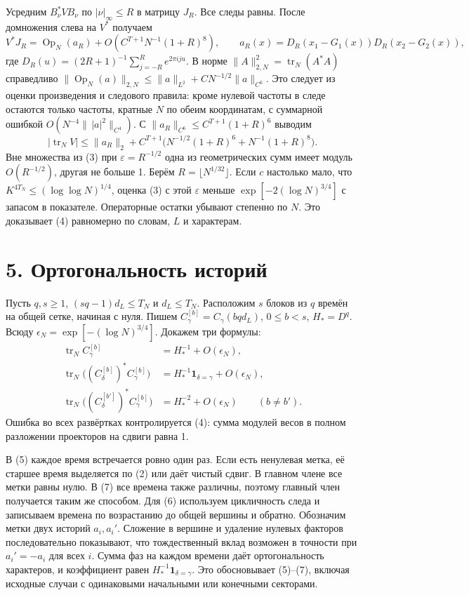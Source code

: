 \documentclass[11pt,a4paper]{article}
\newcommand{\trn}{\operatorname{tr}_N}
\newcommand{\Op}{\operatorname{Op}}
\newcommand{\sect}[1]{\section*{\sffamily\color{ink}#1}}
\begin{document}
Усредним \(B_\nu^* V B_\nu\) по \(|\nu|_\infty\le R\) в матрицу \(J_R\). Все следы равны. После домножения слева на \(V^*\) получаем
\[
 V^*J_R=\Op_N(a_R)+O(C^{T+1}N^{-1}(1+R)^8),\qquad
 a_R(x)=D_R(x_1-G_1(x))D_R(x_2-G_2(x)),
\]
где \(D_R(u)=(2R+1)^{-1}\sum_{j=-R}^R e^{2\pi iju}\).
В норме \(\|A\|_{2,N}^2=\trn(A^*A)\) справедливо
\(\|\Op_N(a)\|_{2,N}\le\|a\|_{L^2}+CN^{-1/2}\|a\|_{C^6}\).
Это следует из оценки произведения и следового правила: кроме нулевой частоты в следе остаются только частоты, кратные \(N\) по обеим координатам, с суммарной ошибкой \(O(N^{-4}\|\,|a|^2\|_{C^4})\). С \(\|a_R\|_{C^6}\le C^{T+1}(1+R)^6\) выводим
\[
   |\trn V|\le \|a_R\|_2+
       C^{T+1}\bigl(N^{-1/2}(1+R)^6+N^{-1}(1+R)^8\bigr).
\]
Вне множества из (3) при \(\varepsilon=R^{-1/2}\) одна из геометрических сумм имеет модуль \(O(R^{-1/2})\), другая не больше 1. Берём \(R=\lfloor N^{1/32}\rfloor\). Если \(c\) настолько мало, что \(K^{4T_N}\le(\log\log N)^{1/4}\), оценка (3) с этой \(\varepsilon\) меньше \(\exp[-2(\log N)^{3/4}]\) с запасом в показателе. Операторные остатки убывают степенно по \(N\). Это доказывает (4) равномерно по словам, \(L\) и характерам.

\newpage
\sect{5. Ортогональность историй}
Пусть \(q,s\ge1\), \((sq-1)d_L\le T_N\) и \(d_L\le T_N\).
Расположим \(s\) блоков из \(q\) времён на общей сетке, начиная с нуля. Пишем \(C_\gamma^{[b]}=C_\gamma(bqd_L)\), \(0\le b<s\), \(H_*=D^q\). Всюду \(\epsilon_N=\exp[-(\log N)^{3/4}]\). Докажем три формулы:
\begin{align}
 \trn C_\gamma^{[b]}&=H_*^{-1}+O(\epsilon_N), \tag{5}\\
 \trn\!\big((C_\delta^{[b]})^*C_\gamma^{[b]}\big)
     &=H_*^{-1}\mathbf1_{\delta=\gamma}+O(\epsilon_N),\tag{6}\\
 \trn\!\big((C_\delta^{[b']})^*C_\gamma^{[b]}\big)
     &=H_*^{-2}+O(\epsilon_N)\qquad(b\ne b').\tag{7}
\end{align}
Ошибка во всех развёртках контролируется (4): сумма модулей весов в полном разложении проекторов на сдвиги равна 1.

В (5) каждое время встречается ровно один раз. Если есть ненулевая метка, её старшее время выделяется по (2) или даёт чистый сдвиг. В главном члене все метки равны нулю. В (7) все времена также различны, поэтому главный член получается таким же способом. Для (6) используем цикличность следа и записываем времена по возрастанию до общей вершины и обратно. Обозначим метки двух историй \(a_i,a_i'\). Сложение в вершине и удаление нулевых факторов последовательно показывают, что тождественный вклад возможен в точности при \(a_i'=-a_i\) для всех \(i\). Сумма фаз на каждом времени даёт ортогональность характеров, и коэффициент равен \(H_*^{-1}\mathbf1_{\delta=\gamma}\). Это обосновывает (5)--(7), включая исходные случаи с одинаковыми начальными или конечными секторами.
\end{document}

